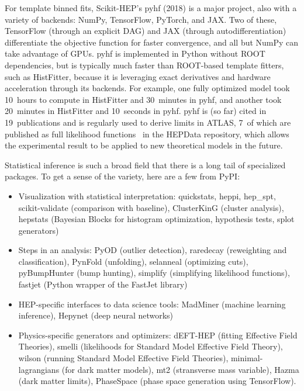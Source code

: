 \documentclass[12pt,a4paper]{article}
\begin{document}
For template binned fits, Scikit-HEP's pyhf (2018) is a major project, also with a variety of backends: NumPy, TensorFlow, PyTorch, and JAX. Two of these, TensorFlow (through an explicit DAG) and JAX (through autodifferentiation) differentiate the objective function for faster convergence, and all but NumPy can take advantage of GPUs. pyhf is implemented in Python without ROOT dependencies, but is typically much faster than ROOT-based template fitters, such as HistFitter, because it is leveraging exact derivatives and hardware acceleration through its backends. For example, one fully optimized model took 10~hours to compute in HistFitter and 30~minutes in pyhf, and another took 20~minutes in HistFitter and 10~seconds in pyhf. pyhf is (so far) cited in 19~publications and is regularly used to derive limits in ATLAS, 7~of which are published as full likelihood functions~\cite{ATL-PHYS-PUB-2019-029} in the HEPData repository, which allows the experimental result to be applied to new theoretical models in the future.

Statistical inference is such a broad field that there is a long tail of specialized packages. To get a sense of the variety, here are a few from PyPI:

\begin{itemize}
\item Visualization with statistical interpretation: quickstats, heppi, hep\_spt, scikit-validate (comparison with baseline), ClusterKinG (cluster analysis), hepstats (Bayesian Blocks for histogram optimization, hypothesis tests, splot generators)
\item Steps in an analysis: PyOD (outlier detection), raredecay (reweighting and classification), PynFold (unfolding), selanneal (optimizing cuts), pyBumpHunter (bump hunting), simplify (simplifying likelihood functions), fastjet (Python wrapper of the FastJet library)
\item HEP-specific interfaces to data science tools: MadMiner (machine learning inference), Hepynet (deep neural networks)
\item Physics-specific generators and optimizers: dEFT-HEP (fitting Effective Field Theories), smelli (likelihoods for Standard Model Effective Field Theory), wilson (running Standard Model Effective Field Theories), minimal-lagrangians (for dark matter models), mt2 (stransverse mass variable), Hazma (dark matter limits), PhaseSpace (phase space generation using TensorFlow).
\end{itemize}
\end{document}
